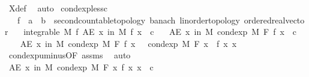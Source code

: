 \begin{isabellebody}
\ X{\isacharunderscore}{\kern0pt}def\ \isamarkupfalse%
\ auto\isanewline
{}\isamarkupfalse%
%
\endisatagproof
{\isafoldproof}%
%
\isadelimproof
\isanewline
%
\endisadelimproof
\isanewline
{}\isamarkupfalse%
\ cond{\isacharunderscore}{\kern0pt}exp{\isacharunderscore}{\kern0pt}less{\isacharunderscore}{\kern0pt}c{\isacharcolon}{\kern0pt}\isanewline
\ \ \ f\ {\isacharcolon}{\kern0pt}{\isacharcolon}{\kern0pt}\ {\isachardoublequoteopen}{\isacharprime}{\kern0pt}a\ {\isasymRightarrow}\ {\isacharprime}{\kern0pt}b\ {\isacharcolon}{\kern0pt}{\isacharcolon}{\kern0pt}\ {\isacharbraceleft}{\kern0pt}second{\isacharunderscore}{\kern0pt}countable{\isacharunderscore}{\kern0pt}topology{\isacharcomma}{\kern0pt}\ banach{\isacharcomma}{\kern0pt}\ linorder{\isacharunderscore}{\kern0pt}topology{\isacharcomma}{\kern0pt}\ ordered{\isacharunderscore}{\kern0pt}real{\isacharunderscore}{\kern0pt}vector{\isacharbraceright}{\kern0pt}{\isachardoublequoteclose}\isanewline
\ \ \ {\isachardoublequoteopen}integrable\ M\ f{\isachardoublequoteclose}\ {\isachardoublequoteopen}AE\ x\ in\ M{\isachardot}{\kern0pt}\ f\ x\ {\isacharless}{\kern0pt}\ c{\isachardoublequoteclose}\isanewline
\ \ \ {\isachardoublequoteopen}AE\ x\ in\ M{\isachardot}{\kern0pt}\ cond{\isacharunderscore}{\kern0pt}exp\ M\ F\ f\ x\ {\isacharless}{\kern0pt}\ c{\isachardoublequoteclose}\isanewline
%
\isadelimproof
%
\endisadelimproof
%
\isatagproof
{}\isamarkupfalse%
\ {\isacharminus}{\kern0pt}\isanewline
\ \ \isamarkupfalse%
\ {\isachardoublequoteopen}AE\ x\ in\ M{\isachardot}{\kern0pt}\ cond{\isacharunderscore}{\kern0pt}exp\ M\ F\ f\ x\ {\isacharequal}{\kern0pt}\ {\isacharminus}{\kern0pt}\ cond{\isacharunderscore}{\kern0pt}exp\ M\ F\ {\isacharparenleft}{\kern0pt}{\isasymlambda}x{\isachardot}{\kern0pt}\ {\isacharminus}{\kern0pt}\ f\ x{\isacharparenright}{\kern0pt}\ x{\isachardoublequoteclose}\ \isamarkupfalse%
\ cond{\isacharunderscore}{\kern0pt}exp{\isacharunderscore}{\kern0pt}uminus{\isacharbrackleft}{\kern0pt}OF\ assms{\isacharparenleft}{\kern0pt}{}{\isacharparenright}{\kern0pt}{\isacharbrackright}{\kern0pt}\ \isamarkupfalse%
\ auto\isanewline
\ \ \isamarkupfalse%
\ \isamarkupfalse%
\ {\isachardoublequoteopen}AE\ x\ in\ M{\isachardot}{\kern0pt}\ cond{\isacharunderscore}{\kern0pt}exp\ M\ F\ {\isacharparenleft}{\kern0pt}{\isasymlambda}x{\isachardot}{\kern0pt}\ {\isacharminus}{\kern0pt}f\ x{\isacharparenright}{\kern0pt}\ x\ {\isachargreater}{\kern0pt}\ {\isacharminus}{\kern0pt}c{\isachardoublequoteclose}\ \ \isamarkupfalse%

\end{isabellebody}
